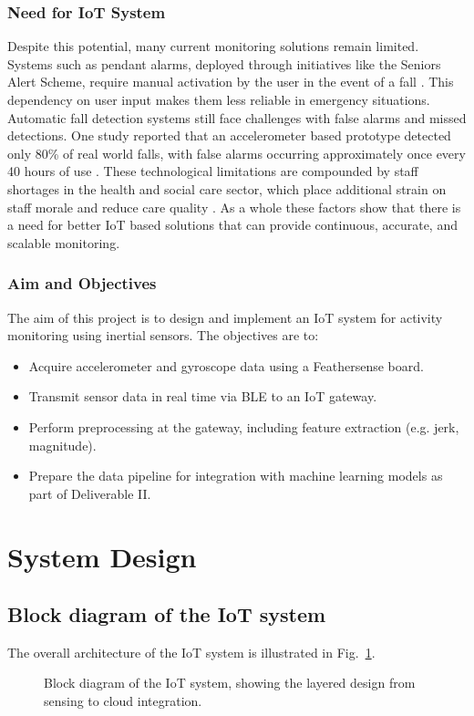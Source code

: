 \documentclass[conference]{IEEEtran}
\begin{document}
\subsubsection{Need for IoT System}
Despite this potential, many current monitoring solutions remain limited. Systems such as pendant alarms, deployed through initiatives like the Seniors Alert Scheme, require manual activation by the user in the event of a fall \cite{b2}. This dependency on user input makes them less reliable in emergency situations. Automatic fall detection systems still face challenges with false alarms and missed detections. One study reported that an accelerometer based prototype detected only 80\% of real world falls, with false alarms occurring approximately once every 40 hours of use \cite{b3}. These technological limitations are compounded by staff shortages in the health and social care sector, which place additional strain on staff morale and reduce care quality \cite{b4}. As a whole these factors show that there is a need for better IoT based solutions that can provide continuous, accurate, and scalable monitoring.

\subsubsection{Aim and Objectives}\label{AO}
The aim of this project is to design and implement an IoT system for activity monitoring using inertial sensors. The objectives are to:
\begin{itemize}
	\item Acquire accelerometer and gyroscope data using a Feathersense board.
	\item Transmit sensor data in real time via BLE to an IoT gateway.
	\item Perform preprocessing at the gateway, including feature extraction (e.g. jerk, magnitude).
	\item Prepare the data pipeline for integration with machine learning models as part of Deliverable II.
\end{itemize}


\section{System Design}

\subsection{Block diagram of the IoT system}
The overall architecture of the IoT system is illustrated in Fig.~\ref{fig:block_diagram}. 
\begin{figure}[h]
	\centering
	\caption{Block diagram of the IoT system, showing the layered design from sensing to cloud integration.}
	\label{fig:block_diagram}
\end{figure}
\end{document}
